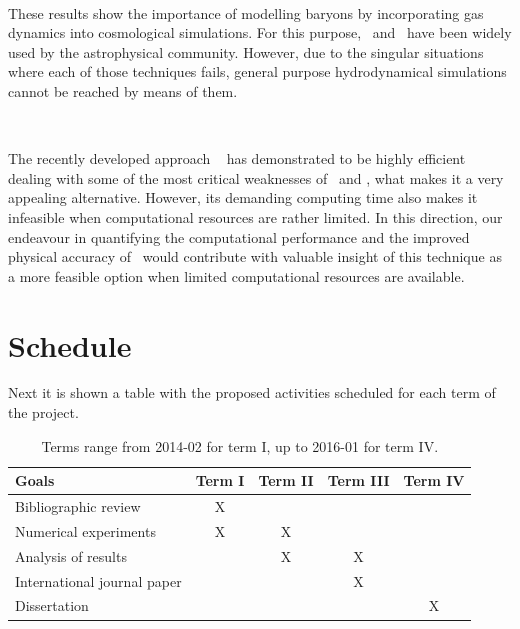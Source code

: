 \documentclass[a4,useAMS,usenatbib,usegraphicx,12pt]{article}
\begin{document}
\

These results show the importance of modelling baryons by incorporating gas 
dynamics into cosmological simulations. For this purpose, \AMR\ and \SPH\ have
been widely used by the astrophysical community. However, due to the singular 
situations where each of those techniques fails, general purpose hydrodynamical
simulations cannot be reached by means of them.

\

The recently developed approach \AREPO\ \citet{Springel10} has demonstrated to 
be highly efficient dealing with some of the most critical weaknesses of \AMR\ 
and \SPH, what makes it a very appealing alternative. However, its demanding 
computing time also makes it infeasible when computational resources are rather 
limited. In this direction, our endeavour in quantifying the computational 
performance and the improved physical accuracy of \VPH\ would contribute with 
valuable insight of this technique as a more feasible option when limited 
computational resources are available.

\newpage
\section{Schedule}
Next it is shown a table with the proposed activities scheduled for each term
of the project.

\begin{table}[h]
\begin{flushleft}
\begin{center}
  \begin{tabular}{l  c c c c } \hline\hline
	\centering\textbf{Goals} & \textbf{Term I} & \textbf{Term II} & \textbf{Term III} & \textbf{Term IV} \\ \hline\hline
	 Bibliographic review & X & & & \\
	 Numerical experiments & X & X & & \\
	 Analysis of results &  & X & X & \\
	 International journal paper &  &  & X & \\
	 Dissertation &  &  &  & X \\
	\hline\hline
  \end{tabular}  
  \caption{ Terms range from 2014-02 for term I, up to 2016-01 for term IV.}
\end{center}
\end{flushleft}
\end{table}



\renewcommand{\bibname}{8\ \ \ \ Bibliography}
\small

\end{document}
